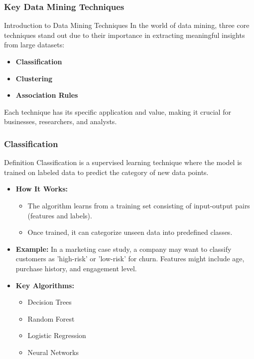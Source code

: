 \documentclass[aspectratio=169]{beamer}
\begin{document}
\begin{frame}[fragile]
    \frametitle{Key Data Mining Techniques}
    \begin{block}{Introduction to Data Mining Techniques}
        In the world of data mining, three core techniques stand out due to their importance in extracting meaningful insights from large datasets: 
        \begin{itemize}
            \item \textbf{Classification}
            \item \textbf{Clustering}
            \item \textbf{Association Rules}
        \end{itemize}
        Each technique has its specific application and value, making it crucial for businesses, researchers, and analysts.
    \end{block}
\end{frame}

\begin{frame}[fragile]
    \frametitle{Classification}
    \begin{block}{Definition}
        Classification is a supervised learning technique where the model is trained on labeled data to predict the category of new data points.
    \end{block}
    
    \begin{itemize}
        \item \textbf{How It Works:}
        \begin{itemize}
            \item The algorithm learns from a training set consisting of input-output pairs (features and labels).
            \item Once trained, it can categorize unseen data into predefined classes.
        \end{itemize}
        
        \item \textbf{Example:} In a marketing case study, a company may want to classify customers as 'high-risk' or 'low-risk' for churn. 
        Features might include age, purchase history, and engagement level.
        
        \item \textbf{Key Algorithms:}
        \begin{itemize}
            \item Decision Trees
            \item Random Forest
            \item Logistic Regression
            \item Neural Networks
        \end{itemize}
    \end{itemize}
\end{frame}
\end{document}
